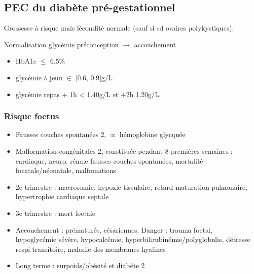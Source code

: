 \documentclass{book}
\begin{document}
\subsection{PEC du diabète pré-gestationnel}
\label{sec:orgc5452d9}
Grossesse à risque mais fécondité normale (sauf si sd ovaires polykystiques).

\danger{} Normalisation glycémie préconception \(\rightarrow\) accouchement
\begin{itemize}
\item HbA1c \(\le\) 6.5\%
\item glycémie à jeun \(\in\) [0.6, 0.9]g/L
\item glycémie repas + 1h < 1.40g/L et +2h 1.20g/L
\end{itemize}

\subsubsection{Risque foetus}
\label{sec:org2856fb7}
\begin{itemize}
\item Fausses couches spontanées \texttimes{}2, \(\propto\) hémoglobine glycquée
\item Malformation congénitales \texttimes{}2, constituée pendant 8 premières semaines :
cardiaque, neuro, rénale \thus \inc fausses couches spontanées, mortalité
foeatale/néonatale, malfomations
\item 2e trimestre : macrosomie, hypoxie tissulaire, retard maturation pulmonaire,
hypertrophie cardiaque septale
\item 3e trimestre : mort foetale
\item Accouchement : \inc prématurés, césariennes. Danger : trauma foetal,
hypoglycémie sévère, hypocalcémie, hyperbilirubinémie/polyglobulie, détresse
respi transitoire, maladie des membranes hyalines
\item Long terme : surpoids/obésité et diabète 2
\end{itemize}
\end{document}
